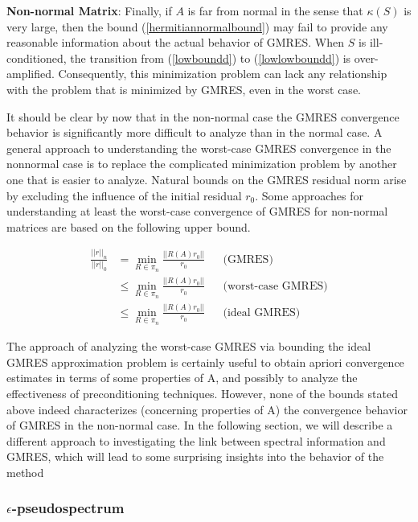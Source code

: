 {	\textbf{Non-normal Matrix}: Finally, if $A$ is far from normal in the sense that $\kappa(S)$ is very large, then the bound (\ref{hermitiannormalbound}) may fail to provide any reasonable information about the actual behavior of GMRES. When $S$ is ill-conditioned, the transition from (\ref{lowboundd}) to (\ref{lowlowboundd}) is over-amplified. Consequently, this minimization problem can lack any relationship with the problem that is minimized by GMRES, even in the worst case. 
	
	It should be clear by now that in the non-normal case the GMRES convergence behavior is significantly more difficult to analyze than in the normal case. A general approach to understanding the worst-case GMRES convergence in the nonnormal case is to replace the complicated minimization problem by another one that is easier to analyze. Natural bounds on the GMRES residual norm arise by excluding the influence of the initial residual $r_0$. Some approaches for understanding at least the worst-case convergence of GMRES for non-normal matrices are based on the following upper bound.
	
	\begin{subequations}
		\begin{align}
		\frac{||r||_n}{||r||_0} &= \min_{R \in \pi_n}\frac{||R(A)r_0||}{r_0} && \text{(GMRES)}\\
		&\leq \min_{R \in \pi_n}\frac{||R(A)r_0||}{r_0} && \text{(worst-case GMRES)}\\
		&\leq \min_{R \in \pi_n}\frac{||R(A)r_0||}{r_0} && \text{(ideal GMRES)} \label{ideal gmres}
		\end{align}
	\end{subequations}
	
	The approach of analyzing the worst-case GMRES via bounding the ideal GMRES approximation problem is certainly useful to obtain apriori convergence estimates in terms of some properties of A, and possibly to analyze the effectiveness of preconditioning techniques. However, none of the bounds stated above indeed characterizes (concerning properties of A) the convergence behavior of GMRES in the non-normal case. In the following section, we will describe a different approach to investigating the link between spectral information and GMRES, which will lead to some surprising insights into the behavior of the method
	
	\subsubsection{$\epsilon$-pseudospectrum}
	
}
